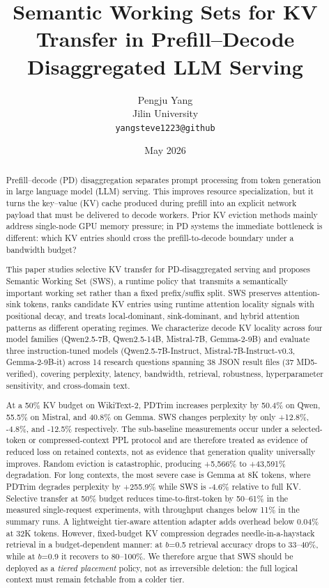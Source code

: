 \documentclass[11pt]{article}
\title{Semantic Working Sets for KV Transfer in Prefill--Decode Disaggregated LLM Serving}
\author{Pengju Yang\\
Jilin University\\
\texttt{yangsteve1223@github}}
\date{May 2026}
\newcommand{\method}{SWS}
\newcommand{\fullmethod}{Semantic Working Set}
\newcommand{\pct}{\%}
\theoremstyle{definition}
\theoremstyle{plain}
\begin{document}
\maketitle

\begin{abstract}
Prefill--decode (PD) disaggregation separates prompt processing from token generation in large language model (LLM) serving.  This improves resource specialization, but it turns the key--value (KV) cache produced during prefill into an explicit network payload that must be delivered to decode workers.  Prior KV eviction methods mainly address single-node GPU memory pressure; in PD systems the immediate bottleneck is different: which KV entries should cross the prefill-to-decode boundary under a bandwidth budget?

This paper studies selective KV transfer for PD-disaggregated serving and proposes \fullmethod{} (\method{}), a runtime policy that transmits a semantically important working set rather than a fixed prefix/suffix split.  \method{} preserves attention-sink tokens, ranks candidate KV entries using runtime attention locality signals with positional decay, and treats local-dominant, sink-dominant, and hybrid attention patterns as different operating regimes.  We characterize decode KV locality across four model families (Qwen2.5-7B, Qwen2.5-14B, Mistral-7B, Gemma-2-9B) and evaluate three instruction-tuned models (Qwen2.5-7B-Instruct, Mistral-7B-Instruct-v0.3, Gemma-2-9B-it) across 14 research questions spanning 38 JSON result files (37 MD5-verified), covering perplexity, latency, bandwidth, retrieval, robustness, hyperparameter sensitivity, and cross-domain text.

At a 50\pct{} KV budget on WikiText-2, PDTrim increases perplexity by 50.4\pct{} on Qwen, 55.5\pct{} on Mistral, and 40.8\pct{} on Gemma.  \method{} changes perplexity by only +12.8\pct{}, -4.8\pct{}, and -12.5\pct{} respectively.  The sub-baseline measurements occur under a selected-token or compressed-context PPL protocol and are therefore treated as evidence of reduced loss on retained contexts, not as evidence that generation quality universally improves.  Random eviction is catastrophic, producing +5{,}566\pct{} to +43{,}591\pct{} degradation.  For long contexts, the most severe case is Gemma at 8K tokens, where PDTrim degrades perplexity by +255.9\pct{} while \method{} is -4.6\pct{} relative to full KV.  Selective transfer at 50\pct{} budget reduces time-to-first-token by 50--61\pct{} in the measured single-request experiments, with throughput changes below 11\pct{} in the summary runs.  A lightweight tier-aware attention adapter adds overhead below 0.04\pct{} at 32K tokens.  However, fixed-budget KV compression degrades needle-in-a-haystack retrieval in a budget-dependent manner: at $b$=0.5 retrieval accuracy drops to 33--40\pct{}, while at $b$=0.9 it recovers to 80--100\pct{}.  We therefore argue that \method{} should be deployed as a \emph{tiered placement} policy, not as irreversible deletion: the full logical context must remain fetchable from a colder tier.
\end{abstract}
\end{document}
